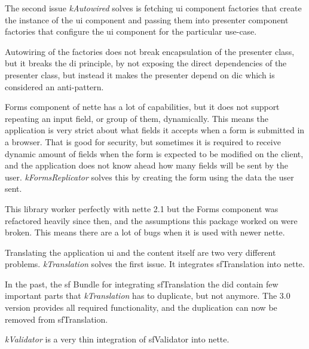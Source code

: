 The second issue \textit{\gls{kAutowired}} solves is fetching \gls{ui} component factories that create the instance of the \gls{ui} component and passing them into presenter component factories that configure the \gls{ui} component for the particular use-case.

Autowiring of the factories does not break encapsulation of the presenter class, but it breaks the \gls{di} principle, by not exposing the direct dependencies of the presenter class, but instead it makes the presenter depend on \gls{dic} which is considered an anti-pattern.

 \label{sec:state:forms-replicator}

Forms component of \gls{nette} has a lot of capabilities, but it does not support repeating an input field, or group of them, dynamically. This means the application is very strict about what fields it accepts when a form is submitted in a browser. That is good for security, but sometimes it is required to receive dynamic amount of fields when the form is expected to be modified on the client, and the application does not know ahead how many fields will be sent by the user. \textit{\gls{kFormsReplicator}} solves this by creating the form using the data the user sent.

This library worker perfectly with \gls{nette} 2.1 but the Forms component was refactored heavily since then, and the assumptions this package worked on were broken. This means there are a lot of bugs when it is used with newer \gls{nette}.

 \label{sec:state:translation}

Translating the application \gls{ui} and the content itself are two very different problems. \textit{\gls{kTranslation}} solves the first issue. It integrates \gls{sfTranslation} into \gls{nette}.

In the past, the \gls{sf} Bundle for integrating \gls{sfTranslation} the did contain few important parts that \textit{\gls{kTranslation}} has to duplicate, but not anymore. The 3.0 version provides all required functionality, and the duplication can now be removed from \gls{sfTranslation}.

 \label{sec:state:validator}

\textit{\gls{kValidator}} is a very thin integration of \gls{sfValidator} into \gls{nette}.

 \label{sec:state:rabbit-mq}

